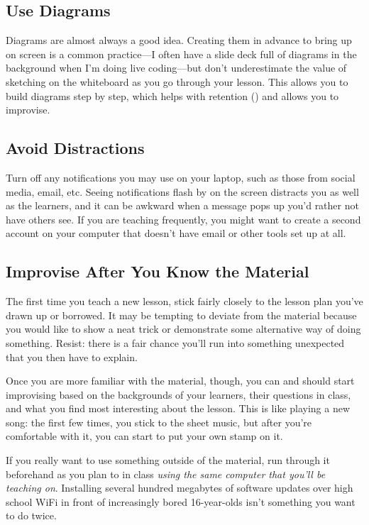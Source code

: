 \subsection*{Use Diagrams}

Diagrams are almost always a good idea.  Creating them in advance to
bring up on screen is a common practice---I often have a slide deck
full of diagrams in the background when I'm doing live coding---but
don't underestimate the value of sketching on the whiteboard as you go
through your lesson. This allows you to build diagrams step by step,
which helps with retention () and
allows you to improvise.

\subsection*{Avoid Distractions}

Turn off any notifications you may use on your laptop, such as those
from social media, email, etc. Seeing notifications flash by on the
screen distracts you as well as the learners, and it can be awkward
when a message pops up you'd rather not have others see.  If you are
teaching frequently, you might want to create a second account on your
computer that doesn't have email or other tools set up at all.

\subsection*{Improvise After You Know the Material}

The first time you teach a new lesson, stick fairly closely to the
lesson plan you've drawn up or borrowed.  It may be tempting to
deviate from the material because you would like to show a neat trick
or demonstrate some alternative way of doing something.  Resist: there
is a fair chance you'll run into something unexpected that you then
have to explain.

Once you are more familiar with the material, though, you can and
should start improvising based on the backgrounds of your learners,
their questions in class, and what you find most interesting about the
lesson.  This is like playing a new song: the first few times, you
stick to the sheet music, but after you're comfortable with it, you
can start to put your own stamp on it.

If you really want to use something outside of the material, run
through it beforehand as you plan to in class \emph{using the same
  computer that you'll be teaching on}.  Installing several hundred
megabytes of software updates over high school WiFi in front of
increasingly bored 16-year-olds isn't something you want to do twice.

